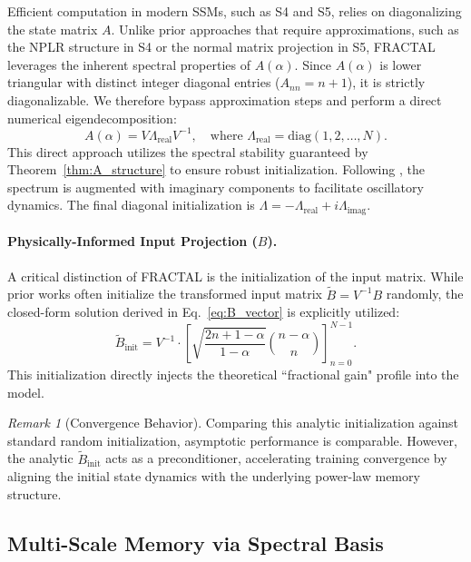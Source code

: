 \documentclass{article}
\theoremstyle{plain}
\theoremstyle{definition}
\theoremstyle{remark}
\newtheorem{remark}[theorem]{Remark}
\begin{document}
Efficient computation in modern SSMs, such as S4 and S5, relies on diagonalizing the state matrix $A$.
Unlike prior approaches that require approximations, such as the NPLR structure in S4 or the normal matrix projection in S5, FRACTAL leverages the inherent spectral properties of $A(\alpha)$.
Since $A(\alpha)$ is lower triangular with distinct integer diagonal entries ($A_{nn} = n+1$), it is strictly diagonalizable. We therefore bypass approximation steps and perform a direct numerical eigendecomposition:
\begin{equation}
	A(\alpha) = V \Lambda_{\text{real}} V^{-1}, \quad \text{where } \Lambda_{\text{real}} = \text{diag}(1, 2, \dots, N).
\end{equation}
This direct approach utilizes the spectral stability guaranteed by Theorem~\ref{thm:A_structure} to ensure robust initialization.
Following \citet{gu2022parameterization}, the spectrum is augmented with imaginary components to facilitate oscillatory dynamics. The final diagonal initialization is $\Lambda = -\Lambda_{\text{real}} + i \Lambda_{\text{imag}}$.


\paragraph{Physically-Informed Input Projection ($B$).}

A critical distinction of FRACTAL is the initialization of the input matrix.
While prior works often initialize the transformed input matrix $\tilde{B} = V^{-1} B$ randomly, the closed-form solution derived in Eq.~\eqref{eq:B_vector} is explicitly utilized:
\begin{equation}
	\tilde{B}_{\text{init}} = V^{-1} \cdot \left[ \sqrt{\frac{2n+1-\alpha}{1-\alpha}} \binom{n-\alpha}{n} \right]_{n=0}^{N-1}.
\end{equation}
This initialization directly injects the theoretical ``fractional gain" profile into the model.

\begin{remark}[Convergence Behavior]
	Comparing this analytic initialization against standard random initialization, asymptotic performance is comparable. However, the analytic $\tilde{B}_{\text{init}}$ acts as a preconditioner, accelerating training convergence by aligning the initial state dynamics with the underlying power-law memory structure.
\end{remark}

\subsection{Multi-Scale Memory via Spectral Basis}
\label{subsec:multichannel}
\end{document}
